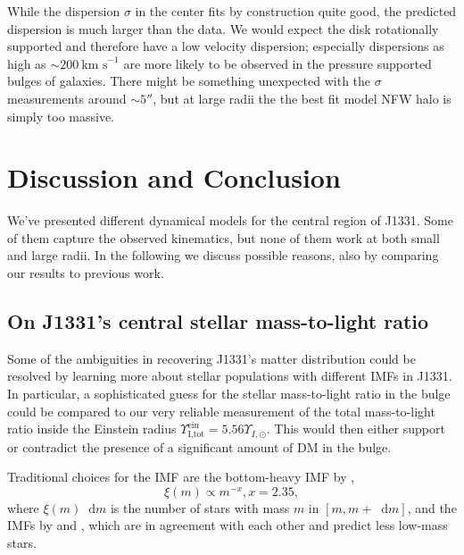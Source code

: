 \documentclass[useAMS,usenatbib]{mnras}
\newcommand*\diff{\mathop{}\!\mathrm{d}}
\begin{document}
While the dispersion $\sigma$ in the center fits by construction quite good, the predicted dispersion is much larger than the data. We would expect the disk rotationally supported and therefore have a low velocity dispersion; especially dispersions as high as $\sim 200~\text{km s}^{-1}$ are more likely to be observed in the pressure supported bulges of galaxies. There might be something unexpected with the $\sigma$ measurements around $\sim 5''$, but at large radii the the best fit model NFW halo is simply too massive.

\section{Discussion and Conclusion} \label{sec:Discussion}

We've presented different dynamical models for the central region of J1331. Some of them capture the observed kinematics, but none of them work at both small and large radii. In the following we discuss possible reasons, also by comparing our results to previous work.

\subsection{On J1331's central stellar mass-to-light ratio} \label{sec:MLdiscussion}

Some of the ambiguities in recovering J1331's matter distribution could be resolved by learning more about stellar populations with different IMFs in J1331. In particular, a sophisticated guess for the stellar mass-to-light ratio in the bulge could be compared to our very reliable measurement of the total mass-to-light ratio inside the Einstein radius $\Upsilon_\text{I,tot}^\text{ein} = 5.56 \Upsilon_{I,\odot}$. This would then either support or contradict the presence of a significant amount of DM in the bulge.

Traditional choices for the IMF are the bottom-heavy IMF by \citet{Salpeter1955},
$$\xi(m) \propto m^{-x}, x=2.35,$$
where $\xi(m) \diff m$ is the number of stars with mass $m$ in $[m,m+\diff m]$, and the IMFs by \citet{2002Sci...295...82K} and \citet{Chabrier2003}, which are in agreement with each other and predict less low-mass stars.
\end{document}
